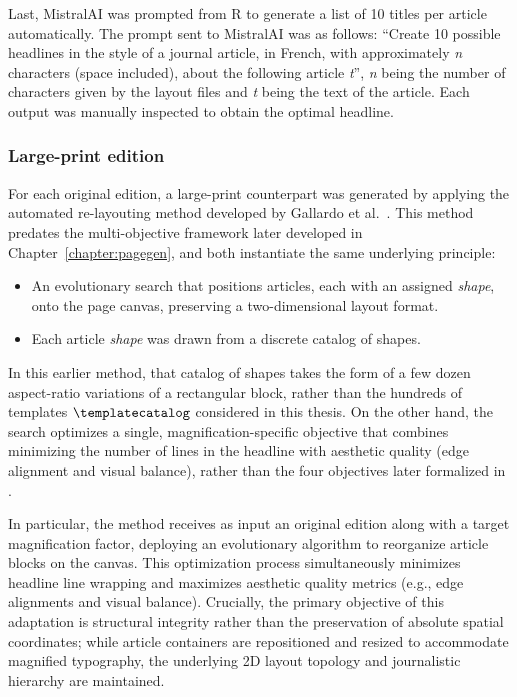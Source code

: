 Last, MistralAI was prompted from R to generate a list of 10 titles per article automatically. The prompt sent to MistralAI was as follows: ``Create 10 possible headlines in the style of a journal article, in French, with approximately \emph{n} characters (space included), about the following article \emph{t}'', \emph{n} being the number of characters given by the layout files and \emph{t} being the text of the article. Each output was manually inspected to obtain the optimal headline. 

\subsubsection{Large-print edition}

For each original edition, a large-print counterpart was generated by applying the automated re-layouting method developed by Gallardo et al.~. This method predates the multi-objective framework later developed in Chapter~\ref{chapter:pagegen}, and both instantiate the same underlying principle: 
\begin{itemize}
    \item An evolutionary search that positions articles, each with an assigned \emph{shape}, onto the page canvas, preserving a two-dimensional layout format.
    \item Each article \emph{shape} was drawn from a discrete catalog of shapes.
\end{itemize}

In this earlier method, that catalog of shapes takes the form of a few dozen aspect-ratio variations of a rectangular block, rather than the hundreds of templates $\templatecatalog$ considered in this thesis. On the other hand, the search optimizes a single, magnification-specific objective that combines minimizing the number of lines in the headline with aesthetic quality (edge alignment and visual balance), rather than the four objectives later formalized in .

In particular, the method receives as input an original edition along with a target magnification factor, deploying an evolutionary algorithm to reorganize article blocks on the canvas. This optimization process simultaneously minimizes headline line wrapping and maximizes aesthetic quality metrics (e.g., edge alignments and visual balance). Crucially, the primary objective of this adaptation is structural integrity rather than the preservation of absolute spatial coordinates; while article containers are repositioned and resized to accommodate magnified typography, the underlying 2D layout topology and journalistic hierarchy are maintained.

